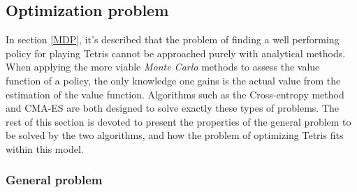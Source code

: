 \subsection{Optimization problem}

In section \ref{MDP}, it's described that the problem of
finding a well performing policy for playing Tetris
cannot be approached purely with analytical methods.
When applying the more viable \textit{Monte Carlo} methods
to assess the value function of a policy, the only 
knowledge one gains is the actual value from the estimation 
of the value function. Algorithms such as the Cross-entropy method
and CMA-ES are both designed to solve exactly these types of problems.
The rest of this section is devoted to present the properties of the 
general problem to be solved by the two algorithms, and how the 
problem of optimizing Tetris fits within this model.

\subsubsection{General problem \label{ProblemFormulation}}

